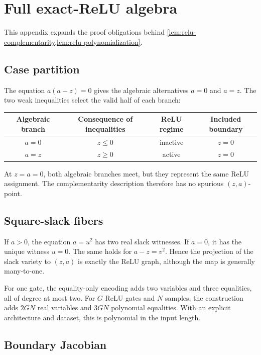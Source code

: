 \section{Full exact-ReLU algebra}
\label{app:relu}

This appendix expands the proof obligations behind
\cref{lem:relu-complementarity,lem:relu-polynomialization}.

\subsection{Case partition}

The equation \(a(a-z)=0\) gives the algebraic alternatives
\(a=0\) and \(a=z\).  The two weak inequalities select the valid half of each
branch:
\begin{center}
\begin{tabular}{cccc}
\toprule
Algebraic branch & Consequence of inequalities & ReLU regime & Included boundary\\
\midrule
\(a=0\) & \(z\le0\) & inactive & \(z=0\)\\
\(a=z\) & \(z\ge0\) & active & \(z=0\)\\
\bottomrule
\end{tabular}
\end{center}
At \(z=a=0\), both algebraic branches meet, but they represent the same ReLU
assignment.  The complementarity description therefore has no spurious
\((z,a)\)-point.

\subsection{Square-slack fibers}

If \(a>0\), the equation \(a=u^2\) has two real slack witnesses.  If \(a=0\),
it has the unique witness \(u=0\).  The same holds for \(a-z=v^2\).  Hence the
projection of the slack variety to \((z,a)\) is exactly the ReLU graph, although
the map is generally many-to-one.

For one gate, the equality-only encoding adds two variables and three
equalities, all of degree at most two.  For \(G\) ReLU gates and \(N\) samples,
the construction adds \(2GN\) real variables and \(3GN\) polynomial
equalities.  With an explicit architecture and dataset, this is polynomial in
the input length.

\subsection{Boundary Jacobian}

